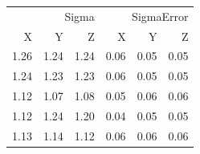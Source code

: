 \begin{tabular}{rrrrrr}
\toprule
\multicolumn{3}{r}{Sigma} & \multicolumn{3}{r}{SigmaError} \\
X & Y & Z & X & Y & Z \\
\midrule
1.26 & 1.24 & 1.24 & 0.06 & 0.05 & 0.05 \\
1.24 & 1.23 & 1.23 & 0.06 & 0.05 & 0.05 \\
1.12 & 1.07 & 1.08 & 0.05 & 0.06 & 0.06 \\
1.12 & 1.24 & 1.20 & 0.04 & 0.05 & 0.05 \\
1.13 & 1.14 & 1.12 & 0.06 & 0.06 & 0.06 \\
\bottomrule
\end{tabular}
